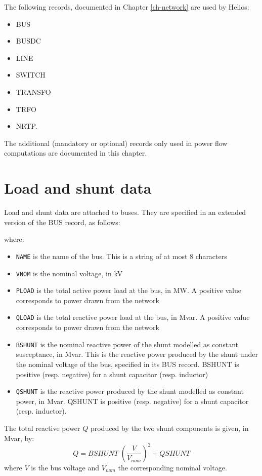 The following records, documented in Chapter \ref{ch-network} are used by Helios:
\begin{itemize}
\item[] BUS
\item[] BUSDC
\item[] LINE
\item[] SWITCH
\item[] TRANSFO
\item[] TRFO
\item[] NRTP.
\end{itemize}

The additional (mandatory or optional) records only used in power flow computations are documented in this chapter.

\section{Load and shunt data}\label{sec-pf-bus}

Load and shunt data are attached to buses. They are specified in an extended version of the BUS record, as follows:

\hspace*{5ex}{\tt BUS NAME VNOM PLOAD QLOAD BSHUNT QSHUNT ;}

where:
\begin{itemize}
\item {\tt NAME} is the name of the bus. This is a string of at most 8 characters
\item {\tt VNOM} is the nominal voltage, in kV
\item {\tt PLOAD} is the total active power load at the bus, in MW. A positive value corresponds to power drawn from the network
\item {\tt QLOAD} is the total reactive power load at the bus, in Mvar. A positive value corresponds to power drawn from the network
\item {\tt BSHUNT} is the nominal reactive power of the shunt modelled as constant susceptance, in Mvar. This is the reactive power produced by the shunt under the nominal voltage of the bus, specified in its BUS record. BSHUNT is positive (resp. negative) for a shunt capacitor (resp. inductor)
\item {\tt QSHUNT} is the reactive power produced by the shunt modelled as constant power, in Mvar. QSHUNT is positive (resp. negative) for a shunt capacitor (resp. inductor).
\end{itemize}

The total reactive power $Q$ produced by the two shunt components is given, in Mvar, by:
\[ Q = BSHUNT \; (\frac{V}{V_{nom}})^2 + QSHUNT \]
where $V$ is the bus voltage and $V_{nom}$ the corresponding nominal voltage.

